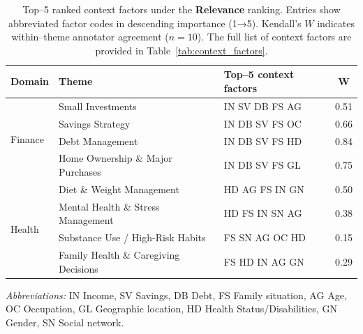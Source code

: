 
\newcommand{\abbr}[1]{\colorbox{black!5}{\scriptsize\textsf{#1}}}

\label{tab:relevance_ranking}
\begin{table}[htb!]
\small
\caption{Top–5 ranked context factors under the \textbf{Relevance} ranking. 
Entries show abbreviated factor codes in descending importance (1→5). 
Kendall’s $W$ indicates within–theme annotator agreement ($n=10$). The full list of context factors are provided in Table~\ref{tab:context_factors}.}
\begin{tabularx}{\linewidth}{l l l c}
\toprule
\textbf{Domain} & \textbf{Theme} & \textbf{Top–5 context factors} & $\mathbf{W}$ \\
\midrule
\multirow{4}{*}{Finance}
 & Small Investments & \abbr{IN} \abbr{SV} \abbr{DB} \abbr{FS} \abbr{AG} & 0.51 \\
 & Savings Strategy & \abbr{IN} \abbr{DB} \abbr{SV} \abbr{FS} \abbr{OC} & 0.66 \\
 & Debt Management & \abbr{IN} \abbr{DB} \abbr{SV} \abbr{FS} \abbr{HD} & 0.84 \\
 & Home Ownership \& Major Purchases & \abbr{IN} \abbr{DB} \abbr{SV} \abbr{FS} \abbr{GL} & 0.75 \\
\midrule
\multirow{4}{*}{Health}
 & Diet \& Weight Management & \abbr{HD} \abbr{AG} \abbr{FS} \abbr{IN} \abbr{GN} & 0.50 \\
 & Mental Health \& Stress Management & \abbr{HD} \abbr{FS} \abbr{IN} \abbr{SN} \abbr{AG} & 0.38 \\
 & Substance Use / High-Risk Habits & \abbr{FS} \abbr{SN} \abbr{AG} \abbr{OC} \abbr{HD} & 0.15 \\
 & Family Health \& Caregiving Decisions & \abbr{FS} \abbr{HD} \abbr{IN} \abbr{AG} \abbr{GN} & 0.29 \\
\bottomrule
\end{tabularx}

\footnotesize
\medskip
\noindent\textit{Abbreviations:}
\abbr{IN} Income,
\abbr{SV} Savings,
\abbr{DB} Debt,
\abbr{FS} Family situation,
\abbr{AG} Age,
\abbr{OC} Occupation,
\abbr{GL} Geographic location,
\abbr{HD} Health Status/Disabilities,
\abbr{GN} Gender,
\abbr{SN} Social network.
\end{table}

